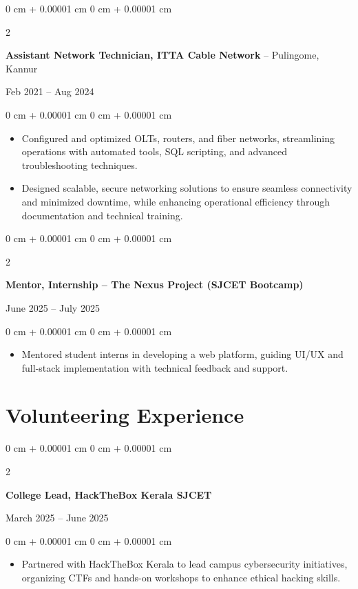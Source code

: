 \documentclass[10pt, a4paper]{article}
\newenvironment{highlights}{
    \begin{itemize}[
        topsep=0.10 cm,
        parsep=0.10 cm,
        partopsep=0pt,
        itemsep=0pt,
        leftmargin=0 cm + 10pt
    ]
}{
    \end{itemize}
} %
\newenvironment{onecolentry}{
    \begin{adjustwidth}{
        0 cm + 0.00001 cm
    }{
        0 cm + 0.00001 cm
    }
}{
    \end{adjustwidth}
} %
\newenvironment{twocolentry}[2][]{
    \onecolentry
    \def\secondColumn{#2}
    \setcolumnwidth{\fill, 4.5 cm}
    \begin{paracol}{2}
}{
    \switchcolumn \raggedleft \secondColumn
    \end{paracol}
    \endonecolentry
} %
\begin{document}
\begin{twocolentry}{
    Feb 2021 – Aug 2024
}
    \textbf{Assistant Network Technician, ITTA Cable Network} -- Pulingome, Kannur
\end{twocolentry}

\vspace{0.10 cm}
\begin{onecolentry}
    \begin{highlights}
        \item Configured and optimized OLTs, routers, and fiber networks, streamlining operations with automated tools, SQL scripting, and advanced troubleshooting techniques.
        \item Designed scalable, secure networking solutions to ensure seamless connectivity and minimized downtime, while enhancing operational efficiency through documentation and technical training.
    \end{highlights}
\end{onecolentry}

\vspace{0.2 cm}

\begin{twocolentry}{
    June 2025 – July 2025
}
    \textbf{Mentor, Internship – The Nexus Project (SJCET Bootcamp)}
\end{twocolentry}

\vspace{0.10 cm}
\begin{onecolentry}
    \begin{highlights}
        \item Mentored student interns in developing a web platform, guiding UI/UX and full-stack implementation with technical feedback and support.
    \end{highlights}
\end{onecolentry}

\section{Volunteering Experience}

    \vspace{0.2 cm}

\begin{twocolentry}{
    March 2025 – June 2025
}
    \textbf{College Lead, HackTheBox Kerala SJCET}
\end{twocolentry}

\vspace{0.10 cm}
\begin{onecolentry}
    \begin{highlights}
        \item Partnered with HackTheBox Kerala to lead campus cybersecurity initiatives, organizing CTFs and hands-on workshops to enhance ethical hacking skills.
    \end{highlights}
\end{onecolentry}
\end{document}
